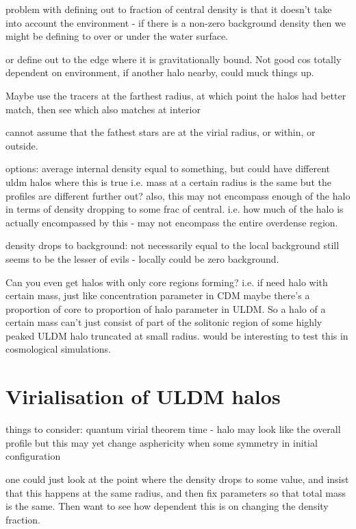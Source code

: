 \documentclass[a4paper,11pt]{article}
\begin{document}
problem with defining out to fraction of central density is that it doesn't take into account the environment - if there is a non-zero background density then we might be defining to over or under the water surface. 

or define out to the edge where it is gravitationally bound. Not good cos totally dependent on environment, if another halo nearby, could muck things up.


Maybe use the tracers at the farthest radius, at which point the halos had better match, then see which also matches at interior

cannot assume that the fathest stars are at the virial radius, or within, or outside.


options: average internal density equal to something, but could have different uldm halos where this is true i.e. mass at a certain radius is the same but the profiles are different further out? also, this may not encompass enough of the halo in terms of density dropping to some frac of central. i.e. how much of the halo is actually encompassed by this - may not encompass the entire overdense region. 

density drops to background: not necessarily equal to the local background still seems to be the lesser of evils - locally could be zero background. 


Can you even get halos with only core regions forming? i.e. if need halo with certain mass, just like concentration parameter in CDM maybe there's a proportion of core to proportion of halo parameter in ULDM. So a halo of a certain mass can't just consist of part of the solitonic region of some highly peaked ULDM halo truncated at small radius. would be interesting to test this in cosmological simulations. 





\section{Virialisation of ULDM halos}

things to consider:
quantum virial theorem
time - halo may look like the overall profile but this may yet change
asphericity when some symmetry in initial configuration


one could just look at the point where the density drops to some value, and insist that this happens at the same radius, and then fix parameters so that total mass is the same. Then want to see how dependent this is on changing the density fraction. 
\end{document}
